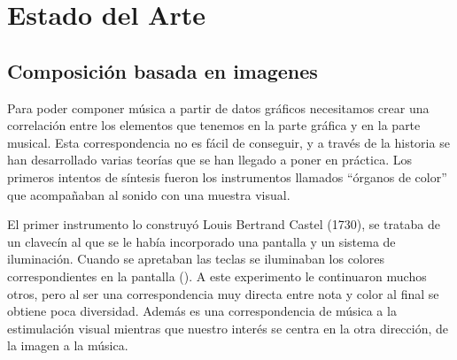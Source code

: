 \section{Estado del Arte}
\label{sec:estadodelarte}



\subsection{Composición basada en imagenes}


Para poder componer música a partir de datos gráficos necesitamos crear una correlación entre los elementos que tenemos en la parte gráfica y en la parte musical. Esta correspondencia no es fácil de conseguir, y a través de la historia se han desarrollado varias teorías que se han llegado a poner en práctica. Los primeros intentos de síntesis fueron los instrumentos llamados ``órganos de color'' que acompañaban al sonido con una muestra visual.

El primer instrumento lo construyó Louis Bertrand Castel (1730), se trataba de un clavecín al que se le había incorporado una pantalla y un sistema de iluminación. Cuando se apretaban las teclas se iluminaban los colores correspondientes en la pantalla (\cite{organosColor}). \color{blue} A este experimento le continuaron muchos otros, pero al ser una correspondencia muy directa entre nota y color al final se obtiene poca diversidad. Además es una correspondencia de música a la estimulación visual mientras que nuestro interés se centra en la otra dirección, de la imagen a la música.\\ \color{black}

